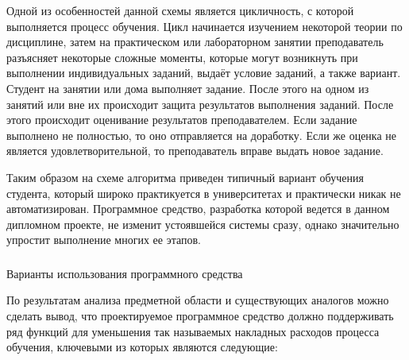 Одной из особенностей данной схемы является цикличность, с которой выполняется процесс обучения. Цикл начинается изучением некоторой теории по дисциплине, затем на практическом или лабораторном занятии преподаватель разъясняет некоторые сложные моменты, которые могут возникнуть при выполнении индивидуальных заданий, выдаёт условие заданий, а также вариант. Студент на занятии или дома выполняет задание. После этого на одном из занятий или вне их происходит защита результатов выполнения заданий. После этого происходит оценивание результатов преподавателем. Если задание выполнено не полностью, то оно отправляется на доработку. Если же оценка не является удовлетворительной, то преподаватель вправе выдать новое задание.

Таким образом на схеме алгоритма приведен типичный вариант обучения студента, который широко практикуется в университетах и практически никак не автоматизирован. Программное средство, разработка которой ведется в данном дипломном проекте, не изменит устоявшейся системы сразу, однако значительно упростит выполнение многих ее этапов.

\subsubsection{} Варианты использования программного средства
\label{sec:domain:model:use_cases}

По результатам анализа предметной области и существующих аналогов можно сделать вывод, что проектируемое программное средство должно поддерживать ряд функций для уменьшения так называемых накладных расходов процесса обучения, ключевыми из которых являются следующие:

